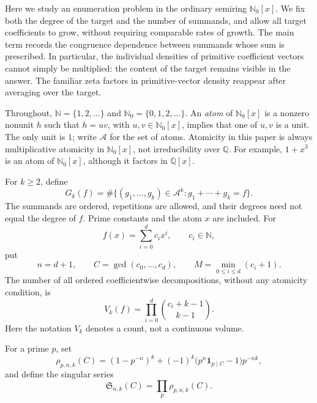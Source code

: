 \documentclass[11pt]{amsart}
\newcommand{\N}{\mathbb N}
\newcommand{\Nzero}{\mathbb N_0}
\newcommand{\Q}{\mathbb Q}
\newcommand{\Atoms}{\mathcal A}
\newcommand{\Sseries}{\mathfrak S}
\newcommand{\ind}{\mathbf 1}
\theoremstyle{definition}
\theoremstyle{remark}
\begin{document}
Here we study an enumeration problem in the ordinary semiring
$\Nzero[x]$. We fix both the degree of the target and the number of
summands, and allow all target coefficients to grow, without requiring
comparable rates of growth. The main term records the congruence
dependence between summands whose sum is prescribed. In particular,
the individual densities of primitive coefficient vectors cannot
simply be multiplied: the content of the target remains visible in
the answer. The familiar zeta factors in primitive-vector density
\cite{Nymann} reappear after averaging over the target.

Throughout, $\N=\{1,2,\ldots\}$ and $\Nzero=\{0,1,2,\ldots\}$.
An \emph{atom} of $\Nzero[x]$ is a nonzero nonunit $h$ such that
$h=uv$, with $u,v\in\Nzero[x]$, implies that one of $u,v$ is a unit.
The only unit is $1$; write $\Atoms$ for the set of atoms.
Atomicity in this paper is always multiplicative atomicity in
$\Nzero[x]$, not irreducibility over $\Q$. For example, $1+x^3$ is
an atom of $\Nzero[x]$, although it factors in $\Q[x]$.

For $k\ge2$, define
\[
G_k(f)=\#\bigl\{(g_1,\ldots,g_k)\in\Atoms^k:
                       g_1+\cdots+g_k=f\bigr\}.
\]
The summands are ordered, repetitions are allowed, and their degrees
need not equal the degree of $f$. Prime constants and the atom $x$ are
included. For
\begin{equation}\label{eq:target}
f(x)=\sum_{i=0}^d c_i x^i,\qquad c_i\in\N,
\end{equation}
put
\begin{equation}\label{eq:notation}
n=d+1,\qquad C=\gcd(c_0,\ldots,c_d),\qquad
M=\min_{0\le i\le d}(c_i+1).
\end{equation}
The number of all ordered coefficientwise decompositions, without any
atomicity condition, is
\begin{equation}\label{eq:volume}
V_k(f)=\prod_{i=0}^d\binom{c_i+k-1}{k-1}.
\end{equation}
Here the notation $V_k$ denotes a count, not a continuous volume.

For a prime $p$, set
\begin{equation}\label{eq:rho}
\rho_{p,n,k}(C)
=(1-p^{-n})^k
 +(-1)^k\bigl(p^n\ind_{p\mid C}-1\bigr)p^{-nk},
\end{equation}
and define the singular series
\begin{equation}\label{eq:series}
\Sseries_{n,k}(C)=\prod_p\rho_{p,n,k}(C).
\end{equation}
\end{document}
